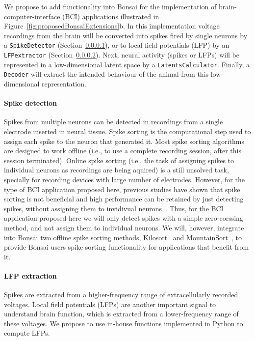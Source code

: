 We propose to add functionality into Bonsai for the implementation of
brain-computer-interface (BCI) applications illustrated in
Figure~\ref{fig:proposedBonsaiExtensions}b. In
this implementation voltage recordings from the brain will be converted into
spikes fired by single neurons by a \texttt{SpikeDetector}
(Section~\ref{sec:spikeDetection}), or to local field potentials (LFP) by an
\texttt{LFPextractor} (Section~\ref{sec:lfpExtraction}). Next, neural activity
(spikes or LFPs) will be represented in a low-dimensional latent space by a
\texttt{LatentsCalculator}. Finally, a \texttt{Decoder} will extract the
intended behaviour of the animal from this low-dimensional representation.

\paragraph{Spike detection}
\label{sec:spikeDetection}

Spikes from multiple neurons can be detected in recordings from a single
electrode inserted in neural tissue. Spike sorting is the computational step
used to assign each spike to the neuron that generated it. Most spike sorting
algorithms are designed to work offline (i.e., to use a complete recording
session, after this session terminated). Online spike sorting (i.e., the task
of assigning spikes to individual neurons as recordings are being aquired) is a
still unsolved task, specially for recording devices with large number of
electrodes.
%
However, for the type of BCI application proposed here, previous studies have
shown that spike sorting is not beneficial and high performance can be retained
by just detecting spikes, without assigning them to invidivual
neurons~\citep{trautmannEtAl19,todorovaEtAl14}. Thus, for the BCI application
proposed here we will only detect spikes with a simple zero-corssing method,
and not assign them to individual neurons.  We will, however, integrate into
Bonsai two offline spike sorting methods, Kilosort~\citep[][written in Matlab]{pachitariuEtAl16} and MountainSort~\citep[][written in
Python]{chungEtAl17}, to provide Bonsai users spike sorting functionality for
applications that benefit from it.

\paragraph{LFP extraction}
\label{sec:lfpExtraction}

Spikes are extracted from a higher-frequency range of extracellularly recorded
voltages. Local field potentials (LFPs) 
are another important signal to understand brain function, which is extracted
from a lower-frequency range of these voltages. We propose to use in-house
functions implemented in Python to compute LFPs.

